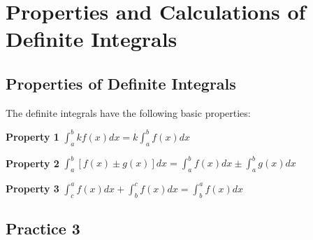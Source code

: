 \documentclass{report}
\begin{document}
\newpage

\section{Properties and Calculations of Definite Integrals}

\subsection*{Properties of Definite Integrals}

The definite integrals have the following basic properties:
\begin{mdframed}[style=MyFrame]
    \textbf{Property 1} \hspace{10pt} $\displaystyle\int_a^b kf(x) dx = k\int_a^b f(x) dx$
\end{mdframed}
\vspace{-2.5em}
\begin{mdframed}[style=MyFrame]
    \textbf{Property 2} \hspace{10pt} $\displaystyle\int_a^b [f(x) \pm g(x)] dx = \int_a^b f(x) dx \pm \int_a^b g(x) dx$
\end{mdframed}
\vspace{-2.5em}
\begin{mdframed}[style=MyFrame]
    \textbf{Property 3} \hspace{10pt} $\displaystyle\int_c^a f(x) dx + \int_b^c f(x) dx = \int_b^a f(x) dx$
\end{mdframed}

\subsection{Practice 3}
\end{document}
